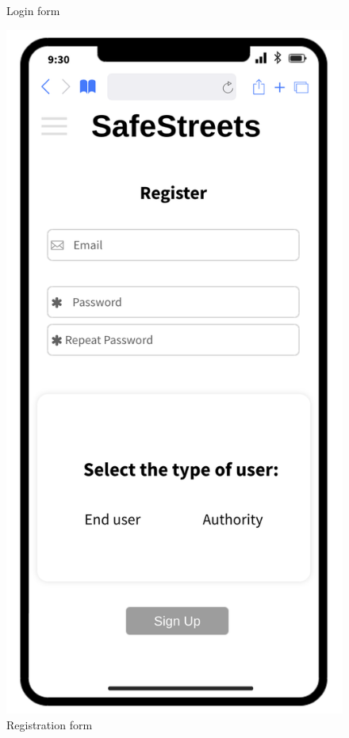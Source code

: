\begin{figure}[H]
\begin{minipage}[b]{0.40\textwidth}
			\caption{Login form}
		\end{minipage}
		\hfill
		\begin{minipage}[b]{0.4\textwidth}
			\includegraphics[width=\textwidth]{Images/rasd-mocks/registration.png}
			\caption{Registration form}
		\end{minipage}
	\end{figure}
	

